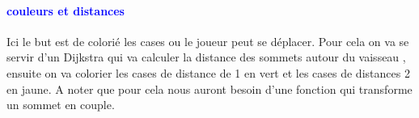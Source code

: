 \documentclass{report}
\begin{document}
			\begin{center}
			\end{center}
			
			
			\paragraph{\textcolor{blue} {couleurs et distances}}
			Ici le but est de colorié les cases ou le joueur peut se déplacer.
			Pour cela on va  se servir d'un Dijkstra qui va calculer la distance des sommets autour du vaisseau , ensuite on va colorier les cases de distance de 1 en vert et les cases de distances 2 en jaune. A noter que pour cela nous auront besoin d'une fonction qui transforme un sommet en couple.
			
				\begin{center}
			\end{center}
			
\end{document}
